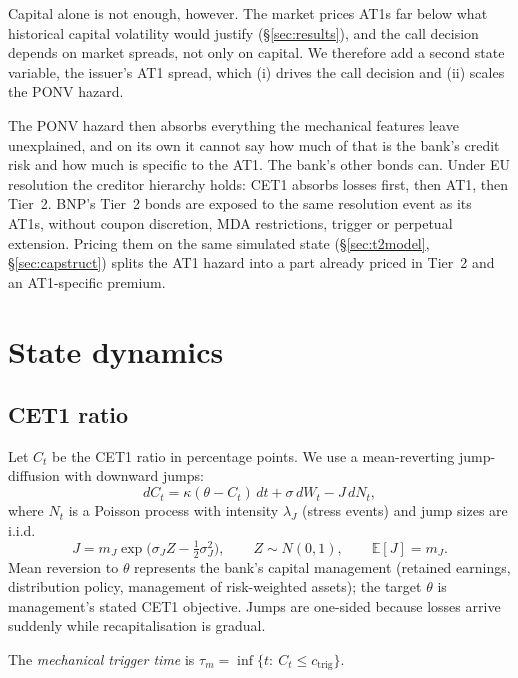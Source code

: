 \documentclass[11pt]{article}
\newcommand{\E}{\mathbb{E}}
\newcommand{\1}{\mathbf{1}}
\newcommand{\ctrig}{c_{\mathrm{trig}}}
\begin{document}
Capital alone is not enough, however. The market prices AT1s far below what
historical capital volatility would justify (\S\ref{sec:results}), and the
call decision depends on market spreads, not only on capital. We therefore add
a second state variable, the issuer's AT1 spread, which (i) drives the call
decision and (ii) scales the PONV hazard.

The PONV hazard then absorbs everything the mechanical features leave
unexplained, and on its own it cannot say how much of that is the bank's credit
risk and how much is specific to the AT1. The bank's other bonds can. Under EU
resolution the creditor hierarchy holds: CET1 absorbs losses first, then AT1,
then Tier~2. BNP's Tier~2 bonds are exposed to the same resolution event as its
AT1s, without coupon discretion, MDA restrictions, trigger or perpetual
extension. Pricing them on the same simulated state
(\S\ref{sec:t2model}, \S\ref{sec:capstruct}) splits the AT1 hazard into a part
already priced in Tier~2 and an AT1-specific premium.

\section{State dynamics}

\subsection{CET1 ratio}
Let $C_t$ be the CET1 ratio in percentage points. We use a mean-reverting
jump-diffusion with downward jumps:
\begin{equation}\label{eq:cet1}
  dC_t = \kappa(\theta - C_t)\,dt + \sigma\,dW_t - J\,dN_t,
\end{equation}
where $N_t$ is a Poisson process with intensity $\lambda_J$ (stress events) and
jump sizes are i.i.d.
\[
  J = m_J \exp\!\bigl(\sigma_J Z - \tfrac12\sigma_J^2\bigr),\qquad Z\sim N(0,1),
  \qquad \E[J]=m_J .
\]
Mean reversion to $\theta$ represents the bank's capital management (retained
earnings, distribution policy, management of risk-weighted assets); the target
$\theta$ is management's stated CET1 objective. Jumps are one-sided because
losses arrive suddenly while recapitalisation is gradual.

The \emph{mechanical trigger time} is
$\tau_m = \inf\{t:\ C_t \le \ctrig\}$.
\end{document}
